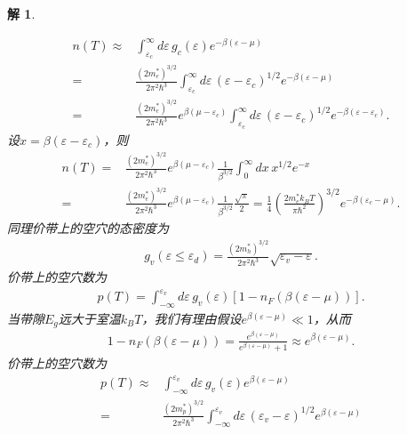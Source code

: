 \documentclass[UTF8,10pt,a4paper]{article}
\theoremstyle{Problem}
\theoremstyle{Solution}
\newtheorem*{sol}{解}
\begin{document}
\begin{sol}
\begin{enumerate}
\begin{itemize}
\begin{align}
                \nonumber n(T)\approx&\int_{\varepsilon_c}^{\infty}d\varepsilon\,g_c(\varepsilon)e^{-\beta(\varepsilon-\mu)}\\
                \nonumber=&\frac{(2m_e^*)^{3/2}}{2\pi^2\hbar^3}\int_{\varepsilon_c}^{\infty}d\varepsilon\,(\varepsilon-\varepsilon_c)^{1/2}e^{-\beta(\varepsilon-\mu)}\\
                =&\frac{(2m_e^*)^{3/2}}{2\pi^2\hbar^3}e^{\beta(\mu-\varepsilon_c)}\int_{\varepsilon_c}^{\infty}d\varepsilon\,(\varepsilon-\varepsilon_c)^{1/2}e^{-\beta(\varepsilon-\varepsilon_c)}.
            \end{align}
            设$x=\beta(\varepsilon-\varepsilon_c)$，则
            \begin{align}
                \label{nT}
                \nonumber n(T)=&\frac{(2m_e^*)^{3/2}}{2\pi^2\hbar^3}e^{\beta(\mu-\varepsilon_c)}\frac{1}{\beta^{3/2}}\int_0^{\infty}dx\,x^{1/2}e^{-x}\\
                =&\frac{(2m_e^*)^{3/2}}{2\pi^2\hbar^3}e^{\beta(\mu-\varepsilon_c)}\frac{1}{\beta^{3/2}}\frac{\sqrt{\pi}}{2}=\frac{1}{4}\left(\frac{2m_e^*k_BT}{\pi\hbar^2}\right)^{3/2}e^{-\beta(\varepsilon_c-\mu)}.
            \end{align}
            同理价带上的空穴的态密度为
            \begin{align}
                g_v(\varepsilon\leq\varepsilon_d)=\frac{(2m_h^*)^{3/2}}{2\pi^2\hbar^3}\sqrt{\varepsilon_v-\varepsilon}.
            \end{align}
            价带上的空穴数为
            \begin{align}
                p(T)=\int_{-\infty}^{\varepsilon_v}d\varepsilon\,g_v(\varepsilon)[1-n_F(\beta(\varepsilon-\mu))].
            \end{align}
            当带隙$E_g$远大于室温$k_BT$，我们有理由假设$e^{\beta(\varepsilon-\mu)}\ll 1$，从而
            \begin{align}
                1-n_F(\beta(\varepsilon-\mu))=\frac{e^{\beta(\varepsilon-\mu)}}{e^{\beta(\varepsilon-\mu)}+1}\approx e^{\beta(\varepsilon-\mu)}.
            \end{align}
            价带上的空穴数为
            \begin{align}
                \label{pT}
                \nonumber p(T)\approx&\int_{-\infty}^{\varepsilon_v}d\varepsilon\,g_v(\varepsilon)e^{\beta(\varepsilon-\mu)}\\
                \nonumber=&\frac{(2m_p^*)^{3/2}}{2\pi^2\hbar^3}\int_{-\infty}^{\varepsilon_v}d\varepsilon\,(\varepsilon_v-\varepsilon)^{1/2}e^{\beta(\varepsilon-\mu)}\\

\end{align}
\end{itemize}
\end{enumerate}
\end{sol}
\end{document}
